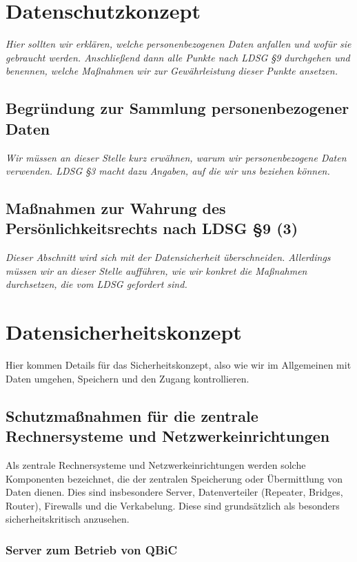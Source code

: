 \documentclass[]{scrreprt}
\begin{document}
\chapter{Datenschutzkonzept}
\textit{Hier sollten wir erklären, welche personenbezogenen Daten anfallen und wofür sie gebraucht werden. Anschließend dann alle Punkte nach LDSG §9 durchgehen und benennen, welche Maßnahmen wir zur Gewährleistung dieser Punkte ansetzen.}


\section{Begründung zur Sammlung personenbezogener Daten}

\textit{Wir müssen an dieser Stelle kurz erwähnen, warum wir personenbezogene Daten verwenden. LDSG §3 macht dazu Angaben, auf die wir uns beziehen können.}

\section{Maßnahmen zur Wahrung des Persönlichkeitsrechts nach LDSG §9 (3)}
\textit{Dieser Abschnitt wird sich mit der Datensicherheit überschneiden.  Allerdings müssen wir an dieser Stelle aufführen, wie wir konkret die Maßnahmen durchsetzen, die vom LDSG gefordert sind.}

\chapter{Datensicherheitskonzept}
Hier kommen Details für das Sicherheitskonzept, also wie wir im Allgemeinen mit Daten umgehen, Speichern und den Zugang kontrollieren.

\section{Schutzmaßnahmen für die zentrale Rechnersysteme und Netzwerkeinrichtungen}

Als zentrale Rechnersysteme und Netzwerkeinrichtungen werden solche Komponenten bezeichnet, die der zentralen Speicherung oder Übermittlung von Daten dienen. Dies sind insbesondere Server, Datenverteiler (Repeater, Bridges, Router), Firewalls und die Verkabelung. Diese sind grundsätzlich als besonders sicherheitskritisch anzusehen.

\subsection{Server zum Betrieb von QBiC}
\end{document}
